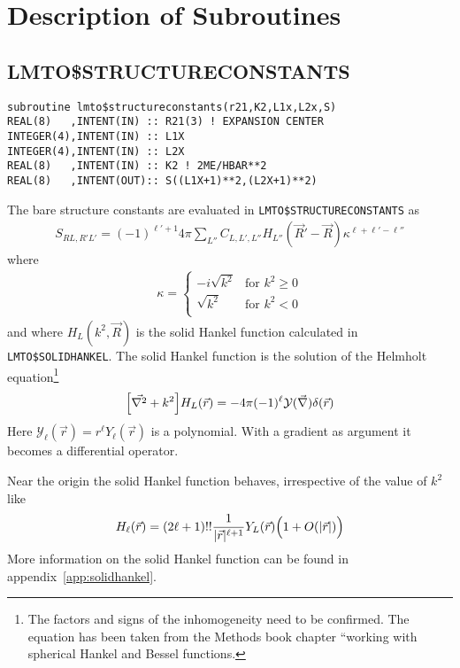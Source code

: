 \documentclass[11pt,a4paper]{report}
\begin{document}
\chapter{Description of Subroutines}
\section{LMTO\$STRUCTURECONSTANTS}
\begin{verbatim}
subroutine lmto$structureconstants(r21,K2,L1x,L2x,S)
REAL(8)   ,INTENT(IN) :: R21(3) ! EXPANSION CENTER
INTEGER(4),INTENT(IN) :: L1X
INTEGER(4),INTENT(IN) :: L2X
REAL(8)   ,INTENT(IN) :: K2 ! 2ME/HBAR**2
REAL(8)   ,INTENT(OUT):: S((L1X+1)**2,(L2X+1)**2)
\end{verbatim}

The bare structure constants are evaluated in 
\verb|LMTO$STRUCTURECONSTANTS| as
\begin{eqnarray}
S_{RL,R'L'}=(-1)^{\ell'+1} 4\pi \sum_{L''} C_{L,L',L''} 
H_{L''}(\vec{R}'-\vec{R})
\kappa^{\ell+\ell'-\ell''}
\end{eqnarray}
where 
\begin{eqnarray}
\kappa=
\begin{cases}
-i\sqrt{k^2} &\text{for $k^2\ge0$}\\
\sqrt{k^2} &\text{for $k^2<0$}\\
\end{cases}
\end{eqnarray}
and where $H_L(k^2,\vec{R})$ is the solid Hankel function calculated
in \verb|LMTO$SOLIDHANKEL|. The solid Hankel function is the solution
of the Helmholt equation\footnote{The factors and signs of the
  inhomogeneity need to be confirmed. The equation has been taken from
  the Methods book chapter ``working with spherical Hankel and Bessel
  functions.}
\begin{eqnarray}
\Bigl[\vec{\nabla^2}+k^2\Bigr]H_{L}(\vec{r})
=-4\pi(-1)^\ell\mathcal{Y}(\vec{\nabla})\delta(\vec{r})
\end{eqnarray}
Here $\mathcal{Y}_\ell(\vec{r})=r^\ell Y_\ell(\vec{r})$ is a
polynomial. With a gradient as argument it becomes a differential
operator.

Near the origin the solid Hankel function behaves, irrespective of the
value of $k^2$ like
\begin{eqnarray}
H_\ell(\vec{r})=(2\ell+1)!! \frac{1}{|\vec{r}|^{\ell+1}}Y_L(\vec{r}) 
\Bigl(1+O(|\vec{r}|)\Bigr)
\end{eqnarray}
More information on the solid Hankel function can be found in
appendix~\ref{app:solidhankel}.
\end{document}
